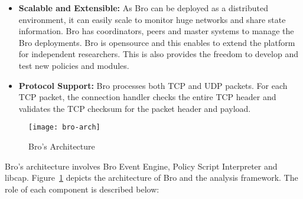 \documentclass[article,msc=informatik,type=msc,colorback,accentcolor=tud9c]{tudthesis}
\begin{document}
\begin{itemize}
		\item\textbf{Scalable and Extensible:} As Bro can be deployed as a distributed environment, it can easily scale to monitor huge networks and share state information. Bro has coordinators, peers and master systems to manage the Bro deployments. 
		Bro is opensource and this enables to extend the platform for independent researchers. This is also provides the freedom to develop and test new policies and modules. 
			
		
		\item\textbf{Protocol Support:} 
		Bro processes both TCP and UDP packets. For each TCP packet, the connection handler checks the entire TCP header and validates the TCP checksum for the packet header and payload. 
		
		
		
		\end{itemize}
	
		         
		        \begin{figure}[H]																					
		           \centering
		           \texttt{[image: bro-arch]}
		           \caption[Bro's Architecture]{\label{f:bro-arch}Bro's Architecture~\cite{Bro}}
		           \end{figure} 
		
		Bro's architecture involves Bro Event Engine, Policy Script Interpreter and libcap. Figure~\ref{f:bro-arch} depicts the architecture of Bro and the analysis framework. The role of each component is described below:
		
\end{document}
